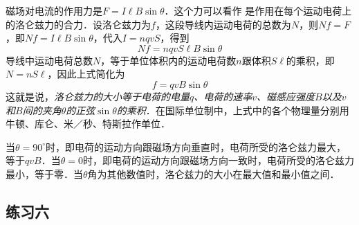 磁场对电流的作用力是$F=I\ell B\sin\theta$．这个力可以看作
是作用在每个运动电荷上的洛仑兹力的合力．设洛仑兹力为$f$，这段导线内运动电荷的总数为$N$，则$Nf=F$，即$Nf=I\ell B\sin\theta$，代入$I=nqvS$，得到
\[Nf=nqvS\ell B\sin\theta \]
导线中运动电荷总数$N$，等于单位体积内的运动电荷数$n$跟体积$S\ell$的乘积，即$N=nS\ell$，因此上式简化为
\[f=qvB\sin\theta \]
这就是说，\textit{洛仑兹力的大小等于电荷的电量$q$、电荷的速率$v$、磁感应强度$B$以及$v$和$B$间的夹角$\theta$的正弦$\sin\theta$的乘积}．在国际单位制中，上式中的各个物理量分别用牛顿、库仑、米／秒、特斯拉作单位．

当$\theta=90^{\circ}$时，即电荷的运动方向跟磁场方向垂直时，电荷所受的洛仑兹力最大，等于$qvB$．当$\theta=0$时，即电荷的运动方向跟磁场方向一致时，电荷所受的洛仑兹力最小，等于零．当$\theta$角为其他数值时，洛仑兹力的大小在最大值和最小值之间．

\subsection*{练习六}

